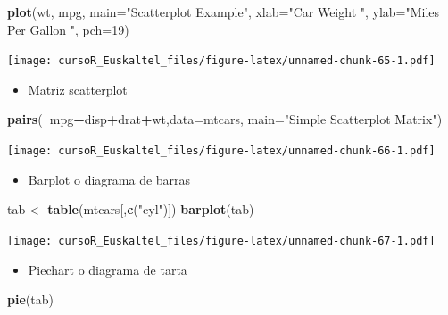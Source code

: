 \documentclass[]{book}
\newenvironment{Shaded}{\begin{snugshade}}{\end{snugshade}}
\newcommand{\KeywordTok}[1]{\textcolor[rgb]{0.13,0.29,0.53}{\textbf{#1}}}
\newcommand{\DataTypeTok}[1]{\textcolor[rgb]{0.13,0.29,0.53}{#1}}
\newcommand{\DecValTok}[1]{\textcolor[rgb]{0.00,0.00,0.81}{#1}}
\newcommand{\StringTok}[1]{\textcolor[rgb]{0.31,0.60,0.02}{#1}}
\newcommand{\OperatorTok}[1]{\textcolor[rgb]{0.81,0.36,0.00}{\textbf{#1}}}
\newcommand{\NormalTok}[1]{#1}
\providecommand{\tightlist}{%
  \setlength{\itemsep}{0pt}\setlength{\parskip}{0pt}}
\begin{document}
\begin{Shaded}
\begin{Highlighting}[]
\KeywordTok{plot}\NormalTok{(wt, mpg, }\DataTypeTok{main=}\StringTok{"Scatterplot Example"}\NormalTok{,}
   \DataTypeTok{xlab=}\StringTok{"Car Weight "}\NormalTok{, }\DataTypeTok{ylab=}\StringTok{"Miles Per Gallon "}\NormalTok{, }\DataTypeTok{pch=}\DecValTok{19}\NormalTok{) }
\end{Highlighting}
\end{Shaded}

\texttt{[image: cursoR\_Euskaltel\_files/figure-latex/unnamed-chunk-65-1.pdf]}

\begin{itemize}
\tightlist
\item
  Matriz scatterplot
\end{itemize}

\begin{Shaded}
\begin{Highlighting}[]
\KeywordTok{pairs}\NormalTok{(}\OperatorTok{~}\NormalTok{mpg}\OperatorTok{+}\NormalTok{disp}\OperatorTok{+}\NormalTok{drat}\OperatorTok{+}\NormalTok{wt,}\DataTypeTok{data=}\NormalTok{mtcars,}
   \DataTypeTok{main=}\StringTok{"Simple Scatterplot Matrix"}\NormalTok{)}
\end{Highlighting}
\end{Shaded}

\texttt{[image: cursoR\_Euskaltel\_files/figure-latex/unnamed-chunk-66-1.pdf]}

\begin{itemize}
\tightlist
\item
  Barplot o diagrama de barras
\end{itemize}

\begin{Shaded}
\begin{Highlighting}[]
\NormalTok{tab <-}\StringTok{ }\KeywordTok{table}\NormalTok{(mtcars[,}\KeywordTok{c}\NormalTok{(}\StringTok{"cyl"}\NormalTok{)])}
\KeywordTok{barplot}\NormalTok{(tab)}
\end{Highlighting}
\end{Shaded}

\texttt{[image: cursoR\_Euskaltel\_files/figure-latex/unnamed-chunk-67-1.pdf]}

\begin{itemize}
\tightlist
\item
  Piechart o diagrama de tarta
\end{itemize}

\begin{Shaded}
\begin{Highlighting}[]
\KeywordTok{pie}\NormalTok{(tab)}
\end{Highlighting}
\end{Shaded}
\end{document}
